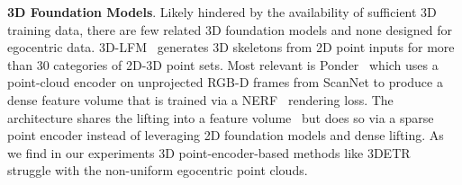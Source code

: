 %


\noindent\textbf{3D Foundation Models}. Likely hindered by the availability of sufficient 3D training data, there are few related 3D foundation models and none designed for egocentric data. 3D-LFM~\cite{dabhi202333dlfm} generates 3D skeletons from 2D point inputs for more than 30 categories of 2D-3D point sets. 
Most relevant is Ponder~\cite{huang2023ponder,zhu2023ponderv2} which uses a point-cloud encoder on unprojected RGB-D frames from ScanNet to produce a dense feature volume that is trained via a NERF~\cite{mildenhall2021nerf} rendering loss. The architecture shares the lifting into a feature volume~\cite{harley2019learning} but does so via a sparse point encoder instead of leveraging 2D foundation models and dense lifting. As we find in our experiments 3D point-encoder-based methods like 3DETR~\cite{misra2021end} struggle with the non-uniform egocentric point clouds.

